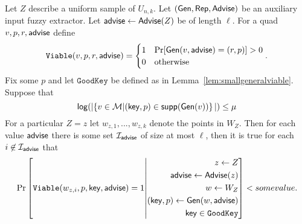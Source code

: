 \begin{lemma}
Let $Z$ describe a uniform sample of $U_{n,k}$.  Let $({\mathsf{Gen}}, {\mathsf{Rep}}, {\mathsf{Advise}})$ be an auxiliary input fuzzy extractor.  Let ${\mathsf{advise}} \leftarrow {\ensuremath{\mathsf{Advise}}}(Z)$ be of length $\ell$.  For a quad $v, p, r, {\mathsf{advise}}$ define 
\[
\mathtt{Viable}(v, p, r, {\mathsf{advise}}) = \begin{cases} 1& \Pr[{\mathsf{Gen}}(v, {\mathsf{advise}}) = (r, p)]>0\\0&\text{otherwise}\end{cases}.\]
Fix some $p$ and let $\mathtt{GoodKey}$ be defined as in Lemma~\ref{lem:smallgeneralviable}. Suppose that 
\[
    \mathsf{log}\!\left(|\!\left\{ v \in \mathcal{M}|\!\left(\mathsf{key}, p\right) \in \mathsf{supp}\!\left(\mathsf{Gen}(v)\right) \right\}|\right) \le \mu 
 \]
 For a particular $Z=z$ let $w_{z,1},..., w_{z,k}$ denote the points in $W_Z$. 
 Then for each value ${\mathsf{advise}}$ there is some set $\mathcal{I}_{{\mathsf{advise}}}$ of size at most $\ell$, then it is true for each $i\not \in \mathcal{I}_{\mathsf{advise}}$ that
\[
\Pr\left[\mathtt{Viable}(w_{z,i}, p, \mathsf{key}, {\mathsf{advise}}) = 1\middle| \begin{aligned} z\leftarrow Z\\ {\mathsf{advise}}\leftarrow {\ensuremath{\mathsf{Advise}}}(z)\\w\leftarrow W_Z\\(\mathsf{key}, p)\leftarrow {\ensuremath{\mathsf{Gen}}}(w, {\mathsf{advise}}) \\\mathsf{key}\in\mathtt{GoodKey}\end{aligned} \right]< some value.
\]
\end{lemma}
